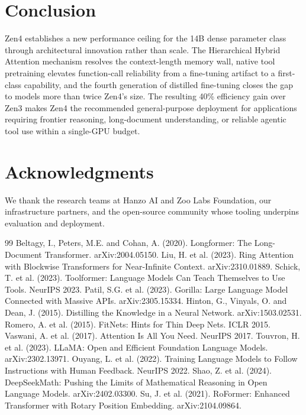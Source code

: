\documentclass[11pt,a4paper]{article}
\begin{document}
\section{Conclusion}

Zen4 establishes a new performance ceiling for the 14B dense parameter class through
architectural innovation rather than scale. The Hierarchical Hybrid Attention mechanism
resolves the context-length memory wall, native tool pretraining elevates function-call
reliability from a fine-tuning artifact to a first-class capability, and the fourth
generation of distilled fine-tuning closes the gap to models more than twice Zen4's size.
The resulting 40\% efficiency gain over Zen3 makes Zen4 the recommended general-purpose
deployment for applications requiring frontier reasoning, long-document understanding,
or reliable agentic tool use within a single-GPU budget.

\section*{Acknowledgments}

We thank the research teams at Hanzo AI and Zoo Labs Foundation, our infrastructure
partners, and the open-source community whose tooling underpins evaluation and deployment.

\begin{thebibliography}{99}
 Beltagy, I., Peters, M.E. and Cohan, A. (2020). Longformer: The Long-Document Transformer. arXiv:2004.05150.
 Liu, H. et al. (2023). Ring Attention with Blockwise Transformers for Near-Infinite Context. arXiv:2310.01889.
 Schick, T. et al. (2023). Toolformer: Language Models Can Teach Themselves to Use Tools. NeurIPS 2023.
 Patil, S.G. et al. (2023). Gorilla: Large Language Model Connected with Massive APIs. arXiv:2305.15334.
 Hinton, G., Vinyals, O. and Dean, J. (2015). Distilling the Knowledge in a Neural Network. arXiv:1503.02531.
 Romero, A. et al. (2015). FitNets: Hints for Thin Deep Nets. ICLR 2015.
 Vaswani, A. et al. (2017). Attention Is All You Need. NeurIPS 2017.
 Touvron, H. et al. (2023). LLaMA: Open and Efficient Foundation Language Models. arXiv:2302.13971.
 Ouyang, L. et al. (2022). Training Language Models to Follow Instructions with Human Feedback. NeurIPS 2022.
 Shao, Z. et al. (2024). DeepSeekMath: Pushing the Limits of Mathematical Reasoning in Open Language Models. arXiv:2402.03300.
 Su, J. et al. (2021). RoFormer: Enhanced Transformer with Rotary Position Embedding. arXiv:2104.09864.
\end{thebibliography}
\end{document}
